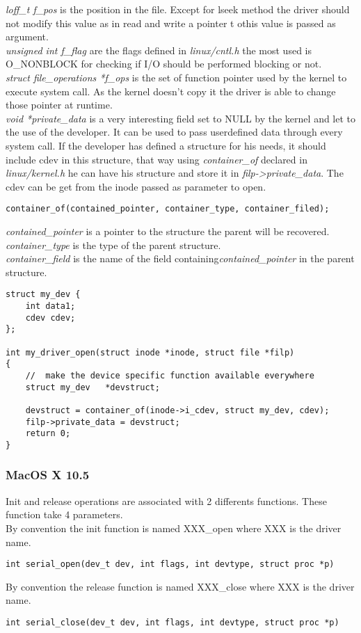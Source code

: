 \documentclass[11pt]{report}
\begin{document}
{\it loff\_t f\_pos} is the position in the file. Except for lseek method the
driver should not modify this value as in read and write a pointer t othis
value is passed as argument.\\
{\it unsigned int f\_flag} are the flags defined in  {\it linux/cntl.h} the
most used is O\_NONBLOCK for checking if I/O should be performed blocking or
not.\\
{\it struct file\_operations *f\_ops} is the set of function pointer
used by the kernel to execute system call. As the kernel doesn't copy it the
driver is able to change those pointer at runtime.\\
{\it void *private\_data} is a very interesting field set to NULL by the
kernel and let to the use of the developer. It can be used to pass userdefined
data through every system call.
If the developer has defined a structure for his needs, it should include
cdev in this structure, that way using {\it container\_of} declared
in {\it linux/kernel.h} he can have his structure and store it in  {\it
filp-\textgreater private\_data}. The cdev can be get from the inode passed as
parameter to open.
\begin{lstlisting}
container_of(contained_pointer, container_type, container_filed);
\end{lstlisting}
{\it contained\_pointer} is a pointer to the structure the parent will be
recovered.\\
{\it container\_type} is the type of the parent structure.\\
{\it container\_field} is the name of the field containing{\it contained\_pointer}
in the parent structure.\\
\begin{lstlisting}
struct my_dev {
    int data1;
    cdev cdev;
};

int my_driver_open(struct inode *inode, struct file *filp)
{
    //  make the device specific function available everywhere
    struct my_dev   *devstruct;
    
    devstruct = container_of(inode->i_cdev, struct my_dev, cdev);
    filp->private_data = devstruct;
    return 0;
}
\end{lstlisting}


\subsubsection{MacOS X 10.5}

Init and release operations are associated with 2 differents functions. These function
take 4 parameters.\\
By convention the init function is named XXX\_open where XXX is the driver 
name.
\begin{lstlisting}
int	serial_open(dev_t dev, int flags, int devtype, struct proc *p)
\end{lstlisting}
By convention the release function is named XXX\_close where XXX is the driver 
name.
\begin{lstlisting}
int	serial_close(dev_t dev, int flags, int devtype, struct proc *p)
\end{lstlisting}
\end{document}
